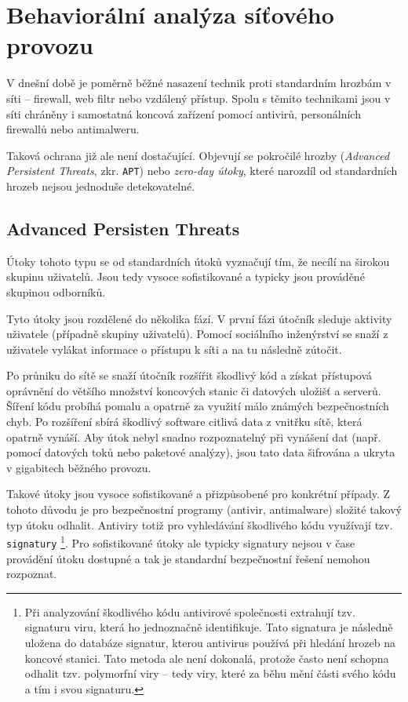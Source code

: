\section{Behaviorální analýza síťového provozu}

V dnešní době je poměrně běžné nasazení technik proti standardním hrozbám v síti -- firewall, web filtr nebo vzdálený přístup.
Spolu s těmito technikami jsou v síti chráněny i samostatná koncová zařízení pomocí antivirů, personálních firewallů nebo antimalweru.

Taková ochrana již ale není dostačující.
Objevují se pokročilé hrozby (\textit{Advanced Persistent Threats}, zkr. \texttt{APT}) nebo \textit{zero-day útoky}, které narozdíl od standardních hrozeb nejsou jednoduše detekovatelné.

\subsection{Advanced Persisten Threats}

Útoky tohoto typu se od standardních útoků vyznačují tím, že necílí na širokou skupinu uživatelů.
Jsou tedy vysoce sofistikované a typicky jsou prováděné skupinou odborníků.

Tyto útoky jsou rozdělené do několika fází.
V první fázi útočník sleduje aktivity uživatele (případně skupiny uživatelů).
Pomocí sociálního inženýrství se snaží z uživatele vylákat informace o přístupu k síti a na tu následně zútočit.

Po průniku do sítě se snaží útočník rozšířit škodlivý kód a získat přístupová oprávnění do většího množství koncových stanic či datových uložišť a serverů.
Šíření kódu probíhá pomalu a opatrně za využití málo známých bezpečnostních chyb.
Po rozšíření sbírá škodlivý software citlivá data z vnitřku sítě, která opatrně vynáší.
Aby útok nebyl snadno rozpoznatelný při vynášení dat (např. pomocí datových toků nebo paketové analýzy), jsou tato data šifrována a ukryta v gigabitech běžného provozu.

Takové útoky jsou vysoce sofistikované a přizpůsobené pro konkrétní případy.
Z tohoto důvodu je pro bezpečnostní programy (antivir, antimalware) složité takový typ útoku odhalit.
Antiviry totiž pro vyhledávání škodlivého kódu využívají tzv. \texttt{signatury}
\footnote{
    Při analyzování škodlivého kódu antivirové společnosti extrahují tzv. signaturu viru, která ho jednoznačně identifikuje.
    Tato signatura je následně uložena do databáze signatur, kterou antivirus používá při hledání hrozeb na koncové stanici.
    Tato metoda ale není dokonalá, protože často není schopna odhalit tzv. polymorfní viry -- tedy viry, které za běhu mění části svého kódu a tím i svou signaturu.
}.
Pro sofistikované útoky ale typicky signatury nejsou v čase provádění útoku dostupné a tak je standardní bezpečnostní řešení nemohou rozpoznat.

